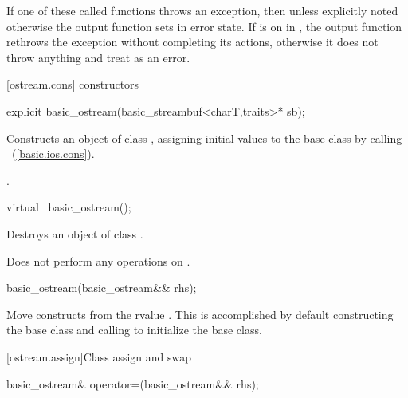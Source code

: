 \pnum
If one of these called functions throws an exception, then unless explicitly noted otherwise
the output function sets
in error state.
If
is on in
,
the output function
rethrows the exception without completing its actions, otherwise
it does not throw anything and treat as an error.

[ostream.cons]{ constructors}

%
\begin{itemdecl}
explicit basic_ostream(basic_streambuf<charT,traits>* sb);
\end{itemdecl}

%
\begin{itemdescr}
\pnum
\effects
Constructs an object of class
,
assigning initial values to the base class by calling
~(\ref{basic.ios.cons}).

\pnum
\postcondition
{}.

%
\begin{itemdecl}
virtual ~basic_ostream();
\end{itemdecl}

\pnum
\effects
Destroys an object of class
.

\pnum
\notes
Does not perform any operations on
.
\end{itemdescr}

%
\begin{itemdecl}
basic_ostream(basic_ostream&& rhs);
\end{itemdecl}

\begin{itemdescr}
\pnum
\effects Move constructs from the rvalue .
This is accomplished by default constructing the base class and calling
 to initialize the
base class.
\end{itemdescr}

[ostream.assign]{Class  assign and swap}

%
%
\begin{itemdecl}
basic_ostream& operator=(basic_ostream&& rhs);
\end{itemdecl}

